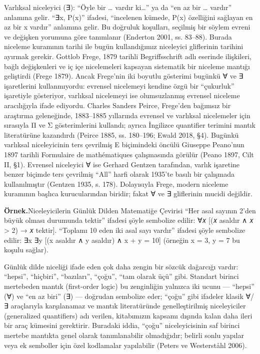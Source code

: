 Varlıksal niceleyici (∃): “Öyle bir … vardır ki…” ya da “en az bir … vardır” anlamına gelir. “∃x, P(x)” ifadesi, “incelenen kümede, P(x) özelliğini sağlayan en az bir x vardır” anlamına gelir. Bu doğruluk koşulları, seçilmiş bir söylem evreni ve değişken yorumuna göre tanımlanır (Enderton 2001, ss. 83–88). Burada niceleme kuramının tarihi ile bugün kullandığımız niceleyici gliflerinin tarihini ayırmak gerekir. Gottlob Frege, 1879 tarihli Begriffsschrift adlı eserinde ilişkileri, bağlı değişkenleri ve iç içe nicelemeleri kapsayan sistematik bir niceleme mantığı geliştirdi (Frege 1879). Ancak Frege’nin iki boyutlu gösterimi bugünkü ∀ ve ∃ işaretlerini kullanmıyordu: evrensel nicelemeyi kendine özgü bir “çukurluk” işaretiyle gösteriyor, varlıksal nicelemeyi ise olumsuzlanmış evrensel niceleme aracılığıyla ifade ediyordu. Charles Sanders Peirce, Frege’den bağımsız bir araştırma geleneğinde, 1883–1885 yıllarında evrensel ve varlıksal nicelemeler için sırasıyla Π ve Σ gösterimlerini kullandı; ayrıca İngilizce quantifier terimini mantık literatürüne kazandırdı (Peirce 1885, ss. 180–196; Ewald 2018, §4). Bugünkü varlıksal niceleyicinin ters çevrilmiş E biçimindeki öncülü Giuseppe Peano’nun 1897 tarihli Formulaire de mathématiques çalışmasında görülür (Peano 1897, Cilt II, §1). Evrensel niceleyici ∀ ise Gerhard Gentzen tarafından, varlık işaretine benzer biçimde ters çevrilmiş “All” harfi olarak 1935’te basılı bir çalışmada kullanılmıştır (Gentzen 1935, s. 178). Dolayısıyla Frege, modern niceleme kuramının başlıca kurucularından biridir; fakat ∀ ve ∃ gliflerinin mucidi değildir.

\begin{tcolorbox}[bookbox,colback=cEx]\textbf{\textsf{\textcolor{cAcc}{Örnek.}}}\quad Niceleyicilerin Günlük Dilden Matematiğe Çevirisi “Her asal sayının 2’den büyük olması durumunda tektir” ifadesi şöyle sembolize edilir: ∀𝑥 [(𝑥 asaldır ∧ 𝑥 > 2) → 𝑥 tektir]. “Toplamı 10 eden iki asal sayı vardır” ifadesi şöyle sembolize edilir: ∃x ∃y [(x asaldır ∧ y asaldır) ∧ x + y = 10] (örneğin x = 3, y = 7 bu koşulu sağlar).\end{tcolorbox}

Günlük dilde niceliği ifade eden çok daha zengin bir sözcük dağarcığı vardır: “hepsi”, “hiçbiri”, “bazıları”, “çoğu”, “tam olarak üçü” gibi. Standart birinci mertebeden mantık (first-order logic) bu zenginliğin yalnızca iki ucunu — “hepsi” (∀) ve “en az biri” (∃) — doğrudan sembolize eder; “çoğu” gibi ifadeler klasik ∀/∃ araçlarıyla karşılanamaz ve mantık literatüründe genelleştirilmiş niceleyiciler (generalized quantifiers) adı verilen, kitabımızın kapsamı dışında kalan daha ileri bir araç kümesini gerektirir. Buradaki iddia, “çoğu” niceleyicisinin saf birinci mertebe mantıkta genel olarak tanımlanabilir olmadığıdır; belirli sonlu yapılar veya ek semboller için özel kodlamalar yapılabilir (Peters ve Westerståhl 2006).

